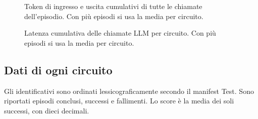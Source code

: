 \begin{figure}[!htbp]\centering

\caption{Token di ingresso e uscita cumulativi di tutte le chiamate dell’episodio. Con più episodi si usa la media per circuito.}
\end{figure}

\begin{figure}[!htbp]\centering

\caption{Latenza cumulativa delle chiamate LLM per circuito. Con più episodi si usa la media per circuito.}
\end{figure}
\FloatBarrier\clearpage
\subsection{Dati di ogni circuito}
Gli identificativi sono ordinati lessicograficamente secondo il manifest Test. Sono riportati episodi conclusi, successi e fallimenti. Lo score è la media dei soli successi, con dieci decimali.
\begingroup\scriptsize
\setlength{\tabcolsep}{5pt}
